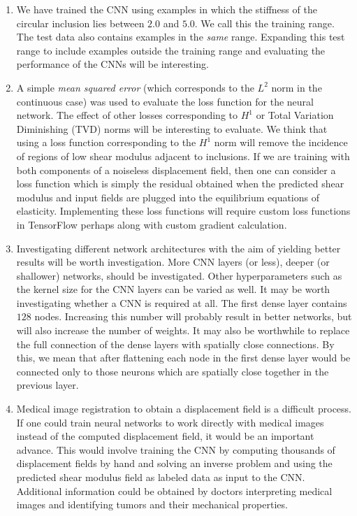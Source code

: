 \documentclass[12pt]{article}
\begin{document}
\begin{enumerate}
\item{We have trained the CNN using examples in which the stiffness of the circular inclusion lies between $2.0$ and $5.0$. We call this the training range. The test data also contains examples in the \textit{same} range. Expanding this test range to include examples outside the training range and evaluating the performance of the CNNs will be interesting.}
\item{A simple \textit{mean squared error} (which corresponds to the $L^2$ norm in the continuous case) was used to evaluate the loss function for the neural network. The effect of other losses corresponding to $H^1$ or Total Variation Diminishing (TVD) norms will be interesting to evaluate. We think that using a loss function corresponding to the $H^1$ norm will remove the incidence of regions of low shear modulus adjacent to inclusions. If we are training with both components of a noiseless displacement field, then one can consider a loss function which is simply the residual obtained when the predicted shear modulus and input fields are plugged into the equilibrium equations of elasticity. Implementing these loss functions will require custom loss functions in TensorFlow perhaps along with custom gradient calculation.}
\item{Investigating different network architectures with the aim of yielding better results will be worth investigation. More CNN layers (or less), deeper (or shallower) networks, should be investigated. Other hyperparameters such as the kernel size for the CNN layers can be varied as well. It may be worth investigating whether a CNN is required at all. The first dense layer contains $128$ nodes. Increasing this number will probably result in better networks, but will also increase the number of weights. It may also be worthwhile to replace the full connection of the dense layers with spatially close connections. By this, we mean that after flattening each node in the first dense layer would be connected only to those neurons which are spatially close together in the previous layer.}
\item{Medical image registration to obtain a displacement field is a difficult process. If one could train neural networks to work directly with medical images instead of the computed displacement field, it would be an important advance. This would involve training the CNN by computing thousands of displacement fields by hand and solving an inverse problem and using the predicted shear modulus field as labeled data as input to the CNN. Additional information could be obtained by doctors interpreting medical images and identifying tumors and their mechanical properties.}

\end{enumerate}
\end{document}

